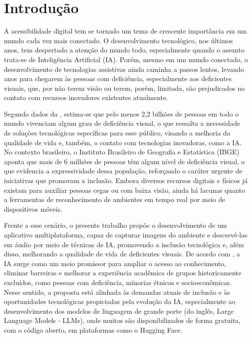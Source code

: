 \chapter{Introdução}

A acessibilidade digital tem se tornado um tema de crescente importância em um mundo cada vez mais conectado. O desenvolvimento tecnológico, nos últimos anos, tem despertado a atenção do mundo todo, especialmente quando o assunto trata-se de Inteligência Artificial (IA). Porém, mesmo em um mundo conectado, o desenvolvimento de tecnologias assistivas ainda caminha a passos lentos, levando anos para chegarem às pessoas com deficiência, especialmente aos deficientes visuais, que, por não terem visão ou terem, porém, limitada, são prejudicados no contato com recursos inovadores existentes atualmente. 

Segundo dados da , estima-se que pelo menos 2,2 bilhões de pessoas em todo o mundo vivenciam algum grau de deficiência visual, o que ressalta a necessidade de soluções tecnológicas específicas para esse público, visando a melhoria da qualidade de vida e, também, o contato com tecnologias inovadoras, como a IA. No contexto brasileiro, o Instituto Brasileiro de Geografia e Estatística (IBGE) aponta que mais de 6 milhões de pessoas têm algum nível de deficiência visual, o que evidencia a expressividade dessa população, reforçando o caráter urgente de iniciativas que promovam a inclusão. Embora diversos recursos digitais e físicos já existam para auxiliar pessoas cegas ou com baixa visão, ainda há lacunas quanto a ferramentas de reconhecimento de ambientes em tempo real por meio de dispositivos móveis.

Frente a esse cenário, o presente trabalho propõe o desenvolvimento de um aplicativo multiplataforma, capaz de capturar imagens do ambiente e descrevê-las em áudio por meio de técnicas de IA, promovendo a inclusão tecnológica e, além disso, melhorando a qualidade de vida de deficientes visuais. De acordo com , a IA surge como um meio promissor para ampliar o acesso ao conhecimento, eliminar barreiras e melhorar a experiência acadêmica de grupos historicamente excluídos, como pessoas com deficiência, minorias étnicas e socioeconômicas. Nesse sentido, a proposta está alinhada às demandas atuais de inclusão e às oportunidades tecnológicas propiciadas pela evolução da IA, especialmente ao desenvolvimento dos modelos de linguagem de grande porte (do inglês, Large Language Models - LLMs), onde muitos são disponibilizados de forma gratuita, com o código aberto, em plataformas como o Hugging Face.

